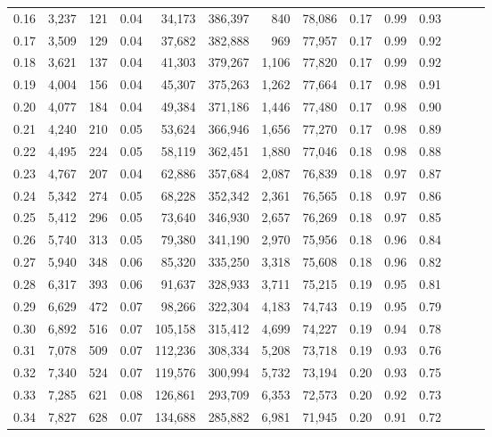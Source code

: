 \begin{tabular}{rrrrrrrrrrrrrr}
0.16 &  3,237 &    121 &  0.04 &   34,173 &  386,397 &     840 &  78,086 &  0.17 &  0.99 &      0.93 \\
0.17 &  3,509 &    129 &  0.04 &   37,682 &  382,888 &     969 &  77,957 &  0.17 &  0.99 &      0.92 \\
0.18 &  3,621 &    137 &  0.04 &   41,303 &  379,267 &   1,106 &  77,820 &  0.17 &  0.99 &      0.92 \\
0.19 &  4,004 &    156 &  0.04 &   45,307 &  375,263 &   1,262 &  77,664 &  0.17 &  0.98 &      0.91 \\
0.20 &  4,077 &    184 &  0.04 &   49,384 &  371,186 &   1,446 &  77,480 &  0.17 &  0.98 &      0.90 \\
0.21 &  4,240 &    210 &  0.05 &   53,624 &  366,946 &   1,656 &  77,270 &  0.17 &  0.98 &      0.89 \\
0.22 &  4,495 &    224 &  0.05 &   58,119 &  362,451 &   1,880 &  77,046 &  0.18 &  0.98 &      0.88 \\
0.23 &  4,767 &    207 &  0.04 &   62,886 &  357,684 &   2,087 &  76,839 &  0.18 &  0.97 &      0.87 \\
0.24 &  5,342 &    274 &  0.05 &   68,228 &  352,342 &   2,361 &  76,565 &  0.18 &  0.97 &      0.86 \\
0.25 &  5,412 &    296 &  0.05 &   73,640 &  346,930 &   2,657 &  76,269 &  0.18 &  0.97 &      0.85 \\
0.26 &  5,740 &    313 &  0.05 &   79,380 &  341,190 &   2,970 &  75,956 &  0.18 &  0.96 &      0.84 \\
0.27 &  5,940 &    348 &  0.06 &   85,320 &  335,250 &   3,318 &  75,608 &  0.18 &  0.96 &      0.82 \\
0.28 &  6,317 &    393 &  0.06 &   91,637 &  328,933 &   3,711 &  75,215 &  0.19 &  0.95 &      0.81 \\
0.29 &  6,629 &    472 &  0.07 &   98,266 &  322,304 &   4,183 &  74,743 &  0.19 &  0.95 &      0.79 \\
0.30 &  6,892 &    516 &  0.07 &  105,158 &  315,412 &   4,699 &  74,227 &  0.19 &  0.94 &      0.78 \\
0.31 &  7,078 &    509 &  0.07 &  112,236 &  308,334 &   5,208 &  73,718 &  0.19 &  0.93 &      0.76 \\
0.32 &  7,340 &    524 &  0.07 &  119,576 &  300,994 &   5,732 &  73,194 &  0.20 &  0.93 &      0.75 \\
0.33 &  7,285 &    621 &  0.08 &  126,861 &  293,709 &   6,353 &  72,573 &  0.20 &  0.92 &      0.73 \\
0.34 &  7,827 &    628 &  0.07 &  134,688 &  285,882 &   6,981 &  71,945 &  0.20 &  0.91 &      0.72 \\

\end{tabular}
